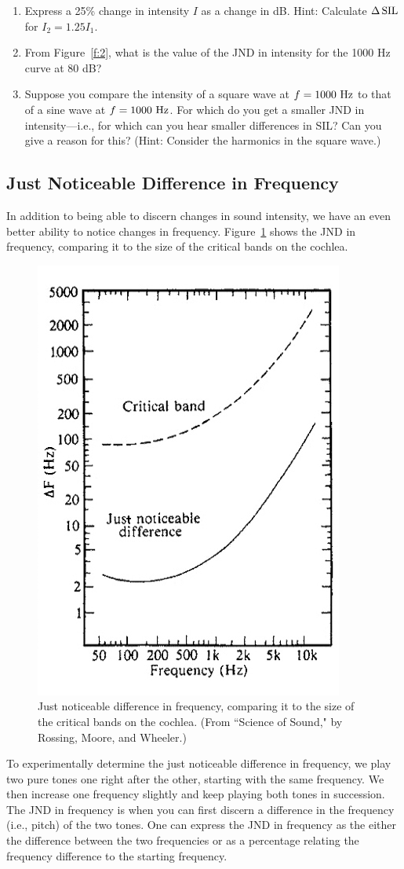 \documentclass[11pt]{NSF}
\def\ben{\begin{enumerate}}
\def\een{\end{enumerate}}
\begin{document}
\ben
\item 
Express a 25\% change in intensity $I$ as a change in dB. 
Hint: Calculate $\Delta\,{\rm SIL}$ for $I_2 = 1.25 I_1$.

\item
From Figure~\ref{f:2}, what is the value of the JND in 
intensity for the 1000 Hz curve at 80 dB?

\item
Suppose you compare the intensity of a square wave at 
$f=1000~{\rm Hz}$ to that of a sine wave at $f=1000~{\rm Hz}$.
For which do you get a smaller JND in intensity---i.e., 
for which can you hear smaller differences in SIL? 
Can you give a reason for this? 
(Hint: Consider the harmonics in the square wave.)
\een

\subsection{Just Noticeable Difference in Frequency}

In addition to being able to discern changes in sound intensity, 
we have an even better ability to notice changes in frequency. 
Figure~\ref{f:jnd_pitch} shows the JND in frequency, comparing 
it to the size of the critical bands on the cochlea.
%
\begin{figure}[hbtp]
\begin{center}
\includegraphics[width=.4\textwidth]{freqJNDa.jpg}
\caption{Just noticeable difference in frequency,
comparing it to the size of the critical bands on the cochlea.
(From ``Science of Sound," by Rossing, Moore, and Wheeler.)}
\label{f:jnd_pitch}
\end{center}
\end{figure}
%

To experimentally determine the just noticeable difference in
frequency, we play two pure tones one right after the other,
starting with the same frequency. 
We then increase one frequency slightly and keep playing both tones 
in succession.
The JND in frequency is when you can first discern a difference in 
the frequency (i.e., pitch) of the two tones.
One can express the JND in frequency as the either the 
difference between the two frequencies or as a percentage relating
the frequency difference to the starting frequency.
\end{document}

